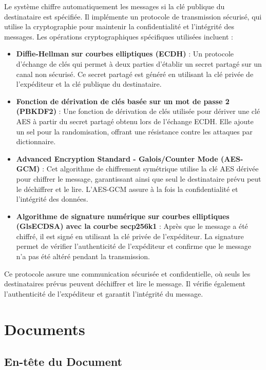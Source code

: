Le système chiffre automatiquement les messages si la clé publique du destinataire est spécifiée. Il implémente un protocole de transmission sécurisé, qui utilise la cryptographie pour maintenir la confidentialité et l'intégrité des messages. Les opérations cryptographiques spécifiques utilisées incluent :

\begin{itemize}
    \item \textbf{Diffie-Hellman sur courbes elliptiques (\Gls{ECDH})} : Un protocole d'échange de clés qui permet à deux parties d'établir un secret partagé sur un canal non sécurisé. Ce secret partagé est généré en utilisant la clé privée de l'expéditeur et la clé publique du destinataire.
    \item \textbf{Fonction de dérivation de clés basée sur un mot de passe 2 (\Gls{PBKDF2})} : Une fonction de dérivation de clés utilisée pour dériver une clé AES à partir du secret partagé obtenu lors de l'échange \Gls{ECDH}. Elle ajoute un sel pour la randomisation, offrant une résistance contre les attaques par dictionnaire.
    \item \textbf{Advanced Encryption Standard - Galois/Counter Mode (AES-GCM)} : Cet algorithme de chiffrement symétrique utilise la clé \Gls{AES} dérivée pour chiffrer le message, garantissant ainsi que seul le destinataire prévu peut le déchiffrer et le lire. L'AES-GCM assure à la fois la confidentialité et l'intégrité des données.
    \item \textbf{Algorithme de signature numérique sur courbes elliptiques (Gls{ECDSA}) avec la courbe secp256k1} : Après que le message a été chiffré, il est signé en utilisant la clé privée de l'expéditeur. La signature permet de vérifier l'authenticité de l'expéditeur et confirme que le message n'a pas été altéré pendant la transmission.
\end{itemize}

Ce protocole assure une communication sécurisée et confidentielle, où seuls les destinataires prévus peuvent déchiffrer et lire le message.
Il vérifie également l'authenticité de l'expéditeur et garantit l'intégrité du message.

\section{Documents}

\subsection{En-tête du Document \label{doc_header}}

